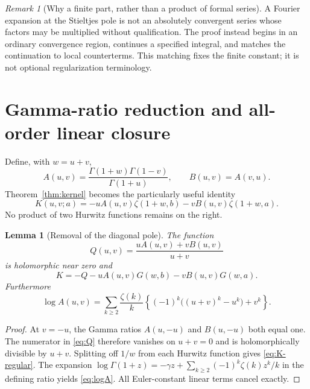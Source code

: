 \documentclass[11pt]{article}
\numberwithin{equation}{section}
\newtheorem{lemma}[theorem]{Lemma}
\theoremstyle{definition}
\theoremstyle{remark}
\newtheorem{remark}[theorem]{Remark}
\begin{document}
\begin{remark}[Why a finite part, rather than a product of formal series]
A Fourier expansion at the Stieltjes pole is not an absolutely convergent
series whose factors may be multiplied without qualification.
The proof instead begins in an ordinary convergence region, continues a
specified integral, and matches the continuation to local counterterms.
This matching fixes the finite constant; it is not optional regularization
terminology.
\end{remark}

\section{Gamma-ratio reduction and all-order linear closure}
\label{sec:closure}

Define, with $w=u+v$,
\begin{equation}
 A(u,v)=\frac{\Gamma(1+w)\Gamma(1-v)}{\Gamma(1+u)},
 \qquad B(u,v)=A(v,u).
 \label{eq:A}
\end{equation}
Theorem~\ref{thm:kernel} becomes the particularly useful identity
\begin{equation}
 K(u,v;a)=-uA(u,v)\zeta(1+w,b)-vB(u,v)\zeta(1+w,a).
 \label{eq:K-hurwitz}
\end{equation}
No product of two Hurwitz functions remains on the right.

\begin{lemma}[Removal of the diagonal pole]
\label{lem:Q}
The function
\begin{equation}
 Q(u,v)=\frac{uA(u,v)+vB(u,v)}{u+v}
 \label{eq:Q}
\end{equation}
is holomorphic near zero and
\begin{equation}
 K=-Q-uA(u,v)G(w,b)-vB(u,v)G(w,a).
 \label{eq:K-regular}
\end{equation}
Furthermore
\begin{equation}
 \log A(u,v)=\sum_{k\ge2}\frac{\zeta(k)}k
 \left\{(-1)^k\bigl((u+v)^k-u^k\bigr)+v^k\right\}.
 \label{eq:logA}
\end{equation}
\end{lemma}
\begin{proof}
At $v=-u$, the Gamma ratios $A(u,-u)$ and $B(u,-u)$ both equal one.
The numerator in \eqref{eq:Q} therefore vanishes on $u+v=0$ and is
holomorphically divisible by $u+v$. Splitting off $1/w$ from each Hurwitz
function gives \eqref{eq:K-regular}.
The expansion
$\log\Gamma(1+z)=-\gamma z+\sum_{k\ge2}(-1)^k\zeta(k)z^k/k$
in the defining ratio yields \eqref{eq:logA}. All Euler-constant linear
terms cancel exactly.
\end{proof}
\end{document}
